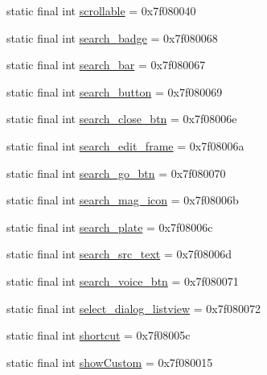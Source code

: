 \begin{CompactItemize}
\item 
static final int \hyperlink{classandroid_1_1support_1_1v4_1_1_r_1_1id_66eebd4fe4923279cbdfce4f59aa42d5}{scrollable} = 0x7f080040
\item 
static final int \hyperlink{classandroid_1_1support_1_1v4_1_1_r_1_1id_3ccdbc877845c96b4f1ede6a9fc0ce07}{search\_\-badge} = 0x7f080068
\item 
static final int \hyperlink{classandroid_1_1support_1_1v4_1_1_r_1_1id_fe24f5bb3556268ae1715b928632a3c8}{search\_\-bar} = 0x7f080067
\item 
static final int \hyperlink{classandroid_1_1support_1_1v4_1_1_r_1_1id_1eeffa2da4dfc6995d6e3953051a6c70}{search\_\-button} = 0x7f080069
\item 
static final int \hyperlink{classandroid_1_1support_1_1v4_1_1_r_1_1id_c048a9cdcb3a508d01051dc193d63f5d}{search\_\-close\_\-btn} = 0x7f08006e
\item 
static final int \hyperlink{classandroid_1_1support_1_1v4_1_1_r_1_1id_496a0719e8a5ad50616c8ab01c37c6da}{search\_\-edit\_\-frame} = 0x7f08006a
\item 
static final int \hyperlink{classandroid_1_1support_1_1v4_1_1_r_1_1id_25f73c2a61d9352245d79baeccd50e54}{search\_\-go\_\-btn} = 0x7f080070
\item 
static final int \hyperlink{classandroid_1_1support_1_1v4_1_1_r_1_1id_d3a6e0108d570358fe7a1fa0cb6ae89b}{search\_\-mag\_\-icon} = 0x7f08006b
\item 
static final int \hyperlink{classandroid_1_1support_1_1v4_1_1_r_1_1id_6034ce67c615744bcdfdc7a54f5625ce}{search\_\-plate} = 0x7f08006c
\item 
static final int \hyperlink{classandroid_1_1support_1_1v4_1_1_r_1_1id_5063c9c248e07dd7e23a66459be93cf2}{search\_\-src\_\-text} = 0x7f08006d
\item 
static final int \hyperlink{classandroid_1_1support_1_1v4_1_1_r_1_1id_2358715ec1f591e70681e772ae80d817}{search\_\-voice\_\-btn} = 0x7f080071
\item 
static final int \hyperlink{classandroid_1_1support_1_1v4_1_1_r_1_1id_0a2ad4eeaf7e94915f66560422c47e62}{select\_\-dialog\_\-listview} = 0x7f080072
\item 
static final int \hyperlink{classandroid_1_1support_1_1v4_1_1_r_1_1id_420b059bf4021449cf52c595931ed740}{shortcut} = 0x7f08005c
\item 
static final int \hyperlink{classandroid_1_1support_1_1v4_1_1_r_1_1id_f6cac7c17682023976252b38f4a34619}{showCustom} = 0x7f080015
\item 

\end{CompactItemize}
